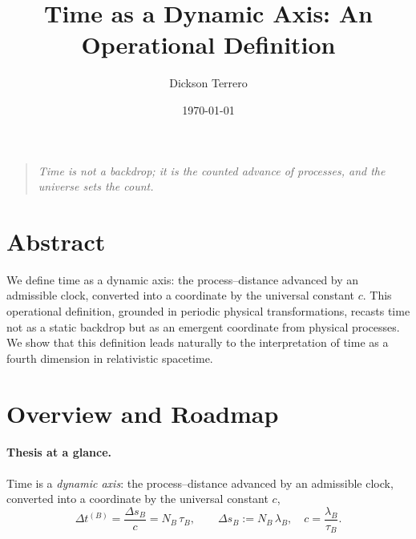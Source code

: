 \documentclass[12pt]{article}
\title{Time as a Dynamic Axis: An Operational Definition}
\author{Dickson Terrero}
\date{\today}
\begin{document}
\maketitle

\begin{quote}\itshape
Time is not a backdrop; it is the counted advance of processes, and the universe sets the count.
\end{quote}

\section*{Abstract}
We define time as a dynamic axis: the process–distance advanced by an admissible clock, converted into a coordinate by the universal constant \(c\). This operational definition, grounded in periodic physical transformations, recasts time not as a static backdrop but as an emergent coordinate from physical processes. We show that this definition leads naturally to the interpretation of time as a fourth dimension in relativistic spacetime.

\section{Overview and Roadmap}

\paragraph{Thesis at a glance.}
Time is a \emph{dynamic axis}: the process–distance advanced by an admissible clock, converted into a coordinate by the universal constant \(c\),
\[
\Delta t^{(B)}=\frac{\Delta s_B}{c}=N_B\,\tau_B,\qquad \Delta s_B:=N_B\,\lambda_B,\quad c=\frac{\lambda_B}{\tau_B}.
\]
\end{document}
